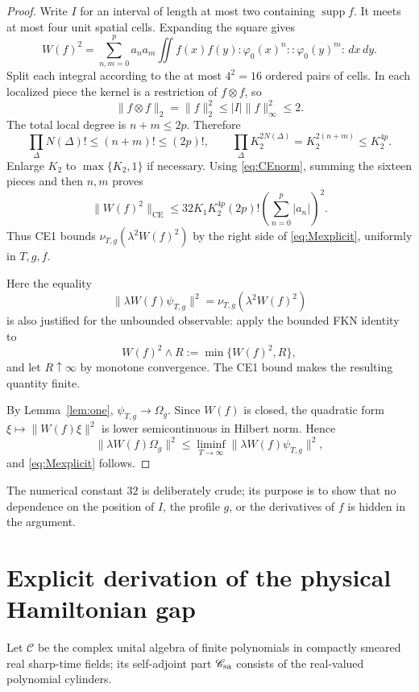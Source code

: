 \documentclass[11pt,a4paper]{article}
\theoremstyle{remark}
\newcommand{\Om}{\Omega}
\newcommand{\CE}{\mathrm{CE}}
\DeclareMathOperator{\supp}{supp}
\begin{document}
\begin{proof}
Write $I$ for an interval of length at most two containing $\supp f$.  It meets at most four
unit spatial cells.  Expanding the square gives
\[
 W(f)^2=\sum_{n,m=0}^pa_na_m
 \iint f(x)f(y):\varphi_0(x)^n::\varphi_0(y)^m:\,dx\,dy.             \tag{4.2}
\]
Split each integral according to the at most $4^2=16$ ordered pairs of cells.  In each localized
piece the kernel is a restriction of $f\otimes f$, so
\[
 \|f\otimes f\|_2=\|f\|_2^2\le |I|\|f\|_\infty^2\le2.
\]
The total local degree is $n+m\le2p$.  Therefore
\[
 \prod_\Delta N(\Delta)!\le(n+m)!\le(2p)!,
 \qquad
 \prod_\Delta K_2^{2N(\Delta)}=K_2^{2(n+m)}\le K_2^{4p}.
\]
Enlarge $K_2$ to $\max\{K_2,1\}$ if necessary.  Using \eqref{eq:CEnorm}, summing the sixteen
pieces and then $n,m$ proves
\begin{equation}\label{eq:observable-norm}
 \|W(f)^2\|_{\CE}
 \le32K_1K_2^{4p}(2p)!\left(\sum_{n=0}^p|a_n|\right)^2.             \tag{4.3}
\end{equation}
Thus CE1 bounds $\nu_{T,g}(\lambda^2W(f)^2)$ by the right side of
\eqref{eq:Mexplicit}, uniformly in $T,g,f$.

Here the equality
\[
 \|\lambda W(f)\psi_{T,g}\|^2=\nu_{T,g}(\lambda^2W(f)^2)
\]
is also justified for the unbounded observable: apply the bounded FKN identity to
\[
 W(f)^2\wedge R:=\min\{W(f)^2,R\},
\]
and let $R\uparrow\infty$ by monotone convergence.  The CE1 bound makes the resulting quantity
finite.

By Lemma~\ref{lem:one}, $\psi_{T,g}\to\Om_g$.  Since $W(f)$ is closed, the quadratic form
$\xi\mapsto\|W(f)\xi\|^2$ is lower semicontinuous in Hilbert norm.  Hence
\[
 \|\lambda W(f)\Om_g\|^2
 \le\liminf_{T\to\infty}\|\lambda W(f)\psi_{T,g}\|^2,
\]
and \eqref{eq:Mexplicit} follows.
\end{proof}

The numerical constant $32$ is deliberately crude; its purpose is to show that no dependence on
the position of $I$, the profile $g$, or the derivatives of $f$ is hidden in the argument.

\section{Explicit derivation of the physical Hamiltonian gap}

Let $\mathscr C$ be the complex unital algebra of finite polynomials in compactly smeared real
sharp-time fields; its self-adjoint part $\mathscr C_{\rm sa}$ consists of the real-valued
polynomial cylinders.
\end{document}
